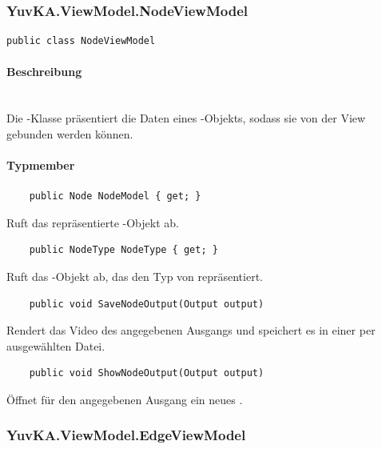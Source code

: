 \subsubsection{YuvKA.ViewModel.NodeViewModel}

\begin{verbatim}
public class NodeViewModel
\end{verbatim}

\paragraph{Beschreibung}~\\
Die -Klasse präsentiert die Daten eines -Objekts, sodass sie von der View gebunden werden können.

\paragraph{Typmember}
\begin{itemize}

	\begin{verbatim}
	public Node NodeModel { get; }
	\end{verbatim}
	Ruft das repräsentierte -Objekt ab.

	\begin{verbatim}
	public NodeType NodeType { get; }
	\end{verbatim}
	Ruft das -Objekt ab, das den Typ von  repräsentiert.

	\begin{verbatim}
	public void SaveNodeOutput(Output output)
	\end{verbatim}
	Rendert das Video des angegebenen Ausgangs und speichert es in einer per  ausgewählten Datei.

	\begin{verbatim}
	public void ShowNodeOutput(Output output)
	\end{verbatim}
	Öffnet für den angegebenen Ausgang ein neues .

\end{itemize}

\subsubsection{YuvKA.ViewModel.EdgeViewModel}

